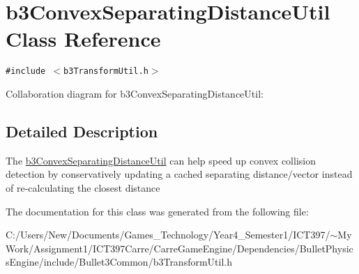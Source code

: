 \hypertarget{classb3_convex_separating_distance_util}{
\section{b3ConvexSeparatingDistanceUtil Class Reference}
\label{classb3_convex_separating_distance_util}
}
{\tt \#include $<$b3TransformUtil.h$>$}

Collaboration diagram for b3ConvexSeparatingDistanceUtil:

\subsection{Detailed Description}
The \hyperlink{classb3_convex_separating_distance_util}{b3ConvexSeparatingDistanceUtil} can help speed up convex collision detection by conservatively updating a cached separating distance/vector instead of re-calculating the closest distance 

The documentation for this class was generated from the following file:\begin{CompactItemize}
\item 
C:/Users/New/Documents/Games\_\-Technology/Year4\_\-Semester1/ICT397/$\sim$My Work/Assignment1/ICT397Carre/CarreGameEngine/Dependencies/BulletPhysicsEngine/include/Bullet3Common/b3TransformUtil.h\end{CompactItemize}
